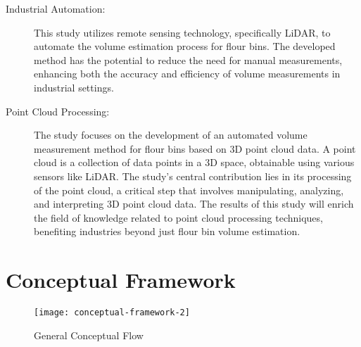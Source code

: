 \begin{description}
	\item[Industrial Automation:] This study utilizes remote sensing technology, specifically LiDAR, to automate the volume estimation process for flour bins. The developed method has the potential to reduce the need for manual measurements, enhancing both the accuracy and efficiency of volume measurements in industrial settings.

	\item[Point Cloud Processing:] The study focuses on the development of an automated volume measurement method for flour bins based on 3D point cloud data. A point cloud is a collection of data points in a 3D space, obtainable using various sensors like LiDAR. The study's central contribution lies in its processing of the point cloud, a critical step that involves manipulating, analyzing, and interpreting 3D point cloud data. The results of this study will enrich the field of knowledge related to point cloud processing techniques, benefiting industries beyond just flour bin volume estimation.
\end{description}

\section{Conceptual Framework}
\label{intro:sec:Conceptual Framework}

\begin{figure}[H]
	\centering
	\texttt{[image: conceptual-framework-2]}
	\caption{General Conceptual Flow}
	\label{fig:conceptual-framework}
\end{figure}

